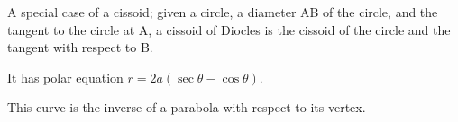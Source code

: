A special case of a cissoid; given a circle, a diameter AB of the circle, and
the tangent to the circle at A, a cissoid of Diocles is the cissoid of
the circle and the tangent with respect to B.
\par
It has polar equation $ r = 2a ( \sec \theta - \cos \theta ) . $
\par
This curve is the inverse of a parabola with respect to its vertex.
